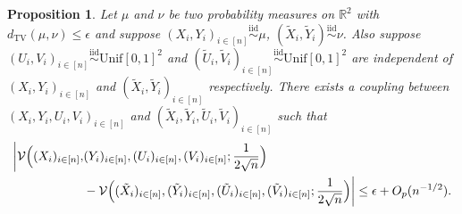 \documentclass[11pt]{article}
\newtheorem{prop}[thm]{Proposition}
\newcommand{\iid}{\stackrel{\mathrm{iid}}\sim}
\begin{document}
\begin{prop}
\label{Prop:TVPerturbation}
Let $\mu$ and $\nu$ be two probability measures on $\mathbb{R}^2$ with $d_{\mathrm{TV}}(\mu, \nu)\leq \epsilon$ and suppose $(X_i,Y_i)_{i\in[n]}\iid \mu$, $(\tilde X_i,\tilde Y_i)\iid \nu$. Also suppose $(U_i,V_i)_{i\in[n]}\iid\mathrm{Unif}[0,1]^2$ and $(\tilde U_i,\tilde V_i)_{i\in[n]}\iid\mathrm{Unif}[0,1]^2$ are independent of $(X_i,Y_i)_{i\in[n]}$ and $(\tilde X_i,\tilde Y_i)_{i\in[n]}$ respectively.  There exists a coupling between $(X_i,Y_i,U_i,V_i)_{i\in[n]}$ and $(\tilde X_i,\tilde Y_i,\tilde U_i,\tilde V_i)_{i\in[n]}$ such that 
\begin{align*}
    \biggl|\mathcal{V}\Bigl((X_i)_{i\in[n]}, &(Y_i)_{i\in[n]}, (U_i)_{i\in[n]},(V_i)_{i\in[n]}; \frac{1}{2\sqrt{n}}\Bigr) \\
    &- \mathcal{V}\Bigl((\tilde X_i)_{i\in[n]}, (\tilde Y_i)_{i\in[n]}, (\tilde U_i)_{i\in[n]},(\tilde V_i)_{i\in[n]}; \frac{1}{2\sqrt{n}}\Bigr)\biggr| \leq \epsilon + O_p(n^{-1/2}).
\end{align*}
\end{prop}
\end{document}
